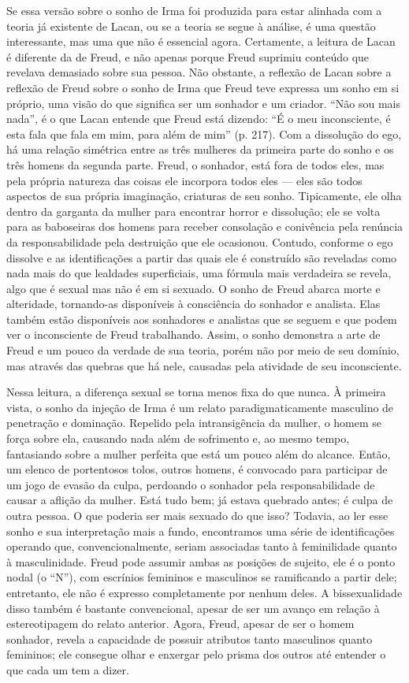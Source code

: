 Se essa versão sobre o sonho de Irma foi produzida para estar alinhada
com a teoria já existente de Lacan, ou se a teoria se segue à análise, é
uma questão interessante, mas uma que não é essencial agora. Certamente,
a leitura de Lacan é diferente da de Freud, e não apenas porque Freud
suprimiu conteúdo que revelava demasiado sobre sua pessoa. Não obstante,
a reflexão de Lacan sobre a reflexão de Freud sobre o sonho de Irma que
Freud teve expressa um sonho em si próprio, uma visão do que significa
ser um sonhador e um criador. ``Não sou mais nada'', é o que Lacan
entende que Freud está dizendo: ``É o meu inconsciente, é esta fala que
fala em mim, para além de mim'' (p. 217). Com a dissolução do ego, há
uma relação simétrica entre as três mulheres da primeira parte do sonho
e os três homens da segunda parte. Freud, o sonhador, está fora de todos
eles, mas pela própria natureza das coisas ele incorpora todos eles ---
eles são todos aspectos de sua própria imaginação, criaturas de seu
sonho. Tipicamente, ele olha dentro da garganta da mulher para encontrar
horror e dissolução; ele se volta para as baboseiras dos homens para
receber consolação e conivência pela renúncia da responsabilidade pela
destruição que ele ocasionou. Contudo, conforme o ego dissolve e as
identificações a partir das quais ele é construído são reveladas como
nada mais do que lealdades superficiais, uma fórmula mais verdadeira se
revela, algo que é sexual mas não é em si sexuado. O sonho de Freud
abarca morte e alteridade, tornando-as disponíveis à consciência do
sonhador e analista. Elas também estão disponíveis aos sonhadores e
analistas que se seguem e que podem ver o inconsciente de Freud
trabalhando. Assim, o sonho demonstra a arte de Freud e um pouco da
verdade de sua teoria, porém não por meio de seu domínio, mas através
das quebras que há nele, causadas pela atividade de seu inconsciente.

Nessa leitura, a diferença sexual se torna menos fixa do que nunca. À
primeira vista, o sonho da injeção de Irma é um relato
paradigmaticamente masculino de penetração e dominação. Repelido pela
intransigência da mulher, o homem se força sobre ela, causando nada além
de sofrimento e, ao mesmo tempo, fantasiando sobre a mulher perfeita que
está um pouco além do alcance. Então, um elenco de portentosos tolos,
outros homens, é convocado para participar de um jogo de evasão da
culpa, perdoando o sonhador pela responsabilidade de causar a aflição da
mulher. Está tudo bem; já estava quebrado antes; é culpa de outra
pessoa. O que poderia ser mais sexuado do que isso? Todavia, ao ler esse
sonho e sua interpretação mais a fundo, encontramos uma série de
identificações operando que, convencionalmente, seriam associadas tanto
à feminilidade quanto à masculinidade. Freud pode assumir ambas as
posições de sujeito, ele é o ponto nodal (o ``N''), com escrínios
femininos e masculinos se ramificando a partir dele; entretanto, ele não
é expresso completamente por nenhum deles. A bissexualidade disso também
é bastante convencional, apesar de ser um avanço em relação à
estereotipagem do relato anterior. Agora, Freud, apesar de ser o homem
sonhador, revela a capacidade de possuir atributos tanto masculinos
quanto femininos; ele consegue olhar e enxergar pelo prisma dos outros
até entender o que cada um tem a dizer.

